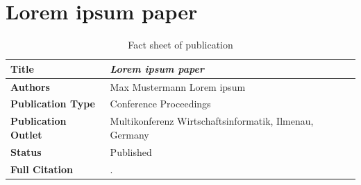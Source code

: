 \chapter{Lorem ipsum paper}
\label{cha:PaperTwoThousandSixteen}

\begin{table}[htpb]
\captionsetup{font=large,textfont=bf,justification=centering}	
\caption*{Fact sheet of publication }
\centering
\begin{tabular}{L{0.25\textwidth}p{0.65\textwidth}}
    \toprule
    \textbf{Title} & \emph{Lorem ipsum paper} \\
    \midrule
    \textbf{Authors} & Max Mustermann \newline Lorem ipsum  \\
    \midrule
	\textbf{Publication Type}  & Conference Proceedings\\
	\midrule
	\textbf{Publication Outlet}  & Multikonferenz Wirtschaftsinformatik, Ilmenau, Germany \\
	\midrule
	\textbf{Status} & Published \\
	\midrule
	\textbf{Full Citation} & . \\
    \bottomrule
\end{tabular}
\label{tab:pub:Paper2016Lorem}
\end{table}